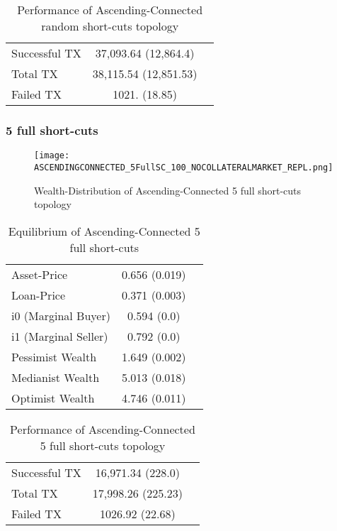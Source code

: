 \documentclass[Bachelorarbeit.tex]{subfiles}
\begin{document}
\begin{table}[h]
	\caption{Performance of Ascending-Connected random short-cuts topology}
	\centering
	\begin{tabular} { l c r }
		\hline
		Successful TX & 37,093.64 (12,864.4) \\
		Total TX & 38,115.54 (12,851.53) \\
		Failed TX & 1021. (18.85) \\
		\hline
	\end{tabular}
\end{table}

\subsubsection{5 full short-cuts}
\begin{figure}[H]
	\centering
  \texttt{[image: ASCENDINGCONNECTED\_5FullSC\_100\_NOCOLLATERALMARKET\_REPL.png]}
	\caption{Wealth-Distribution of Ascending-Connected 5 full short-cuts topology}
	\label{fig1}
\end{figure}

\begin{table}[h]
	\caption{Equilibrium of Ascending-Connected 5 full short-cuts}
	\centering
	\begin{tabular} { l c r }
		\hline
		Asset-Price & 0.656 (0.019) \\
		Loan-Price & 0.371 (0.003) \\
		i0 (Marginal Buyer) & 0.594 (0.0) \\
		i1 (Marginal Seller) & 0.792 (0.0) \\
		Pessimist Wealth & 1.649 (0.002) \\
		Medianist Wealth & 5.013 (0.018) \\
		Optimist Wealth & 4.746 (0.011) \\
		\hline
	\end{tabular}
\end{table} 

\begin{table}[h]
	\caption{Performance of Ascending-Connected 5 full short-cuts topology}
	\centering
	\begin{tabular} { l c r }
		\hline
		Successful TX & 16,971.34 (228.0) \\
		Total TX & 17,998.26 (225.23) \\
		Failed TX & 1026.92 (22.68) \\
		\hline
	\end{tabular}
\end{table}
\end{document}
